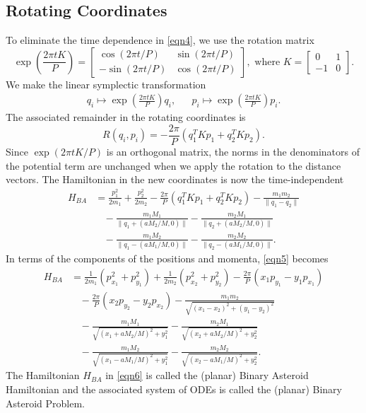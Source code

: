 \documentclass[12pt]{article}
\begin{document}
\subsection{Rotating Coordinates}
To eliminate the time dependence in \eqref{eqn4}, we use the rotation matrix
\begin{equation*}
\exp\left(\frac{2\pi tK}{P}\right) = \begin{bmatrix}\cos(2\pi t/P) & \sin(2\pi t/P) \\ -\sin(2\pi t/P) & \cos(2\pi t/P)\end{bmatrix}, \text{ where } K = \begin{bmatrix} 0 & 1 \\ -1 & 0 \end{bmatrix}.
\end{equation*}
We make the linear symplectic transformation
\begin{align*}
q_i \mapsto \exp\left(\frac{2\pi tK}{P}\right)q_i, & & p_i \mapsto \exp\left(\frac{2\pi tK}{P}\right)p_i.
\end{align*}
The associated remainder in the rotating coordinates is
\begin{equation*}
R(q_i,p_i) = -\frac{2\pi}{P}\left(q_1^TKp_1 + q_2^TKp_2\right).
\end{equation*}
Since $\exp\left(2\pi tK/P\right)$ is an orthogonal matrix, the norms in the denominators of the potential term are unchanged when we apply the rotation to the distance vectors. The Hamiltonian in the new coordinates is now the time-independent
\begin{align}
H_{BA} 
& = \frac{p_1^2}{2m_1} + \frac{p_2^2}{2m_2} - \frac{2\pi}{P}\left(q_1^TKp_1 + q_2^TKp_2\right) - \frac{m_1m_2}{\|q_1 - q_2\|} \nonumber\\
& \ \ \ \  - \frac{m_1M_1}{\|q_1 + (aM_2/M, 0)\|} - \frac{m_2M_1}{\|q_2 + (aM_2/M, 0)\|} \nonumber\\
& \ \ \ \  - \frac{m_1M_2}{\|q_1 - (aM_1/M, 0)\|} - \frac{m_2M_2}{\|q_2 - (aM_1/M, 0)\|}.
\label{eqn5}
\end{align}
In terms of the components of the positions and momenta, \eqref{eqn5} becomes
\begin{align}
H_{BA} & = \frac{1}{2m_1}\left(p_{x_1}^2 + p_{y_1}^2\right) + \frac{1}{2m_2}\left(p_{x_2}^2 + p_{y_2}^2\right) - \frac{2\pi}{P}\left(x_1p_{y_1} - y_1p_{x_1}\right)\nonumber\\
& \ \ \ \ - \frac{2\pi}{P}\left(x_2p_{y_2} - y_2p_{x_2}\right) - \frac{m_1m_2}{\sqrt{(x_1 - x_2)^2 + (y_1 - y_2)^2}} \nonumber\\
& \ \ \ \ - \frac{m_1M_1}{\sqrt{(x_1 + aM_2/M)^2 + y_1^2}} - \frac{m_2M_1}{\sqrt{(x_2 + aM_2/M)^2 + y_2^2}} \nonumber\\
& \ \ \ \ - \frac{m_1M_2}{\sqrt{(x_1 - aM_1/M)^2 + y_1^2}} - \frac{m_2M_2}{\sqrt{(x_2 - aM_1/M)^2 + y_2^2}}.
\label{eqn6}
\end{align}
The Hamiltonian $H_{BA}$ in \eqref{eqn6} is called the (planar) Binary Asteroid Hamiltonian and the associated system of ODEs is called the (planar) Binary Asteroid Problem.
\end{document}
